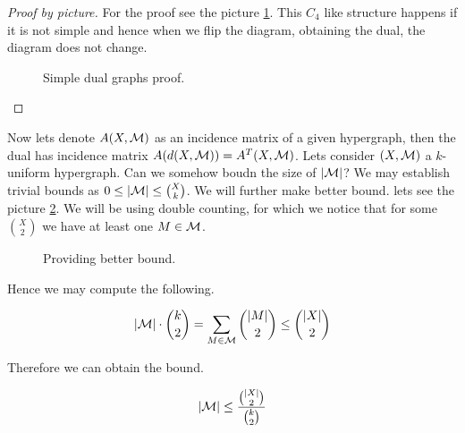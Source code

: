 \begin{proof}[Proof by picture]
	For the proof see the picture \ref{simple-dual-hg}. This $C_4$ like structure happens if it is not simple and hence when we flip the diagram, obtaining the dual, the diagram does not change.
	
	\begin{figure}[!ht]\centering
		\caption{Simple dual graphs proof.}
		\label{simple-dual-hg}
	\end{figure}
\end{proof}

Now lets denote $A(X,\mathcal{M})$ as an incidence matrix of a given hypergraph, then the dual has incidence matrix $A(d(X,\mathcal{M})) = A^T(X,\mathcal{M})$. Lets consider $(X, \mathcal{M})$ a $k$-uniform hypergraph. Can we somehow boudn the size of $|\mathcal{M}|$? We may establish trivial bounds as $0 \leq |\mathcal{M}| \leq \binom{X}{k}$. We will further make better bound. lets see the picture \ref{bounds}. We will be using double counting, for which we notice that for some $\binom{X}{2}$ we have at least one $M \in \mathcal{M}$.

\begin{figure}[!ht]\centering
	\caption{Providing better bound.}
	\label{bounds}
\end{figure}

\noindent Hence we may compute the following.

$$
|\mathcal{M}| \cdot \binom{k}{2} = \sum_{M \in \mathcal{M}} \binom{|M|}{2} \leq \binom{|X|}{2}
$$

\noindent Therefore we can obtain the bound.

$$
|\mathcal{M}| \leq \frac{\binom{|X|}{2}}{\binom{k}{2}}
$$

